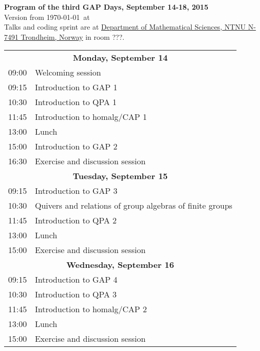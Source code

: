 \documentclass[12pt,a4paper]{article}
\begin{document}
\begin{center}
{\huge\textbf{Program of the third GAP Days, September 14-18, 2015}\\[2mm]}
Version from \today\ at \currenttime\\[2mm]
Talks and coding sprint are at \href{https://www.google.de/maps/place/Technisch-Naturwissenschaftliche+Universität+Norwegens/@63.4163247,10.4036534,16z/data=!4m2!3m1!1s0x466d31bfd8c0937f:0xb4fde91ca281978b}{Department of Mathematical Sciences, NTNU N-7491 Trondheim, Norway}
in room ???.
\end{center}

\newcommand{\talk}[3]{#1 & #2 \\ & \textit{#3} \\}

\newcommand{\newday}[1]{\multicolumn{2}{c}{{\large\textbf{#1}}} \\[1em]}


\begin{tabular}{rp{14.5cm}}
%
\newday{Monday, September 14}
09:00 & Welcoming session \\
09:15 & Introduction to GAP 1 \\
10:30 & Introduction to QPA 1 \\
11:45 & Introduction to homalg/CAP 1 \\
13:00 & Lunch \\
15:00 & Introduction to GAP 2 \\
16:30 & Exercise and discussion session

%
%
\\
%
%
\newday{Tuesday, September 15}
09:15 & Introduction to GAP 3 \\
10:30 & Quivers and relations of group algebras of finite groups  \\
11:45 & Introduction to QPA 2 \\
13:00 & Lunch \\
15:00 & Exercise and discussion session

%
%
\\
%
%
\newday{Wednesday, September 16}
09:15 & Introduction to GAP 4 \\
10:30 & Introduction to QPA 3 \\
11:45 & Introduction to homalg/CAP 2 \\
13:00 & Lunch \\
15:00 & Exercise and discussion session
\end{tabular}
\end{document}
